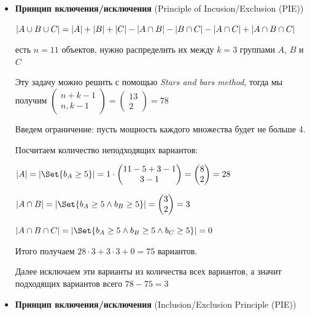 \documentclass[12pt]{article}
\begin{document}

    \begin{itemize}
        \item \textbf{Принцип включения/исключения} (Principle of Incusion/Exclusion (PIE))

        $|A \cup B \cup C| = |A| + |B| + |C| - |A \cap B| - |B \cap C| - |A \cap C| + |A \cap B \cap C|$

        \Ex есть $n = 11$ объектов, нужно распределить их между $k = 3$ группами $A$, $B$ и $C$

        Эту задачу можно решить с помощью \textit{Stars and bars method}, тогда мы получим $
        \begin{pmatrix} n + k - 1 \\ n, k - 1 \end{pmatrix} = \begin{pmatrix} 13 \\ 2 \end{pmatrix} = 78$

        Введем ограничение: пусть мощность каждого множества будет не больше 4.

        Посчитаем количество неподходящих вариантов:

        $|A| = |\Set{b_A \geq 5}| = 1 \cdot
        \begin{pmatrix} 11 - 5 + 3 - 1 \\ 3 - 1 \end{pmatrix} =
        \begin{pmatrix} 8 \\ 2 \end{pmatrix} = 28$

        $|A \cap B| = |\Set{b_A \geq 5 \land b_B \geq 5}| =
        \begin{pmatrix} 3 \\ 2 \end{pmatrix} = 3$

        $|A \cap B \cap C| = |\Set{b_A \geq 5 \land b_B \geq 5 \land b_C \geq 5}| = 0$

        Итого получаем $28 \cdot 3 + 3 \cdot 3 + 0 = 75$ вариантов.

        Далее исключаем эти варианты из количества всех вариантов, а значит подходящих вариантов всего $78 - 75 = 3$

        \vspace{5mm}
        \item \textbf{Принцип включения/исключения} (Inclusion/Exclusion Principle (PIE))


\end{itemize}
\end{document}
